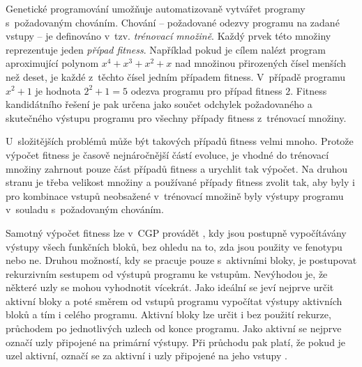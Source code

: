 Genetické programování umožňuje automatizovaně vytvářet programy s~požadovaným chováním. Chování -- požadované odezvy programu na zadané vstupy -- je definováno v~tzv. \emph{trénovací množině}. Každý prvek této množiny reprezentuje jeden \emph{případ fitness}. Například pokud je cílem nalézt program aproximující polynom $x^4 + x^3 + x^2 +x$ nad množinou přirozených čísel menších než deset, je každé z~těchto čísel jedním případem fitness. V~případě programu $x^2 + 1$ je hodnota $2^2 + 1 = 5$ odezva programu pro případ fitness $2$. Fitness kandidátního řešení je pak určena jako součet odchylek požadovaného a skutečného výstupu programu pro všechny případy fitness z~trénovací množiny.

U~složitějších problémů může být takových případů fitness velmi mnoho. Protože výpočet fitness je časově nejnáročnější částí evoluce, je vhodné do trénovací množiny zahrnout pouze část případů fitness a urychlit tak výpočet. Na druhou stranu je třeba velikost množiny a používané případy fitness zvolit tak, aby byly i pro kombinace vstupů neobsažené v~trénovací množině byly výstupy programu v~souladu s~požadovaným chováním.






Samotný výpočet fitness lze v~CGP provádět , kdy jsou postupně vypočítávány výstupy všech funkčních bloků, bez ohledu na to, zda jsou použity ve fenotypu nebo ne. Druhou možností, kdy se pracuje pouze s~aktivními bloky, je postupovat rekurzivním sestupem od výstupů programu ke vstupům. Nevýhodou je, že některé uzly se mohou vyhodnotit vícekrát. Jako ideální se jeví nejprve určit aktivní bloky a poté směrem od vstupů programu vypočítat výstupy aktivních bloků a tím i celého programu. Aktivní bloky lze určit i bez použití rekurze, průchodem po jednotlivých uzlech od konce programu. Jako aktivní se nejprve označí uzly připojené na primární výstupy. Při průchodu pak platí, že pokud je uzel aktivní, označí se za aktivní i uzly připojené na jeho vstupy \cite{Modra, HandbookGP}.

